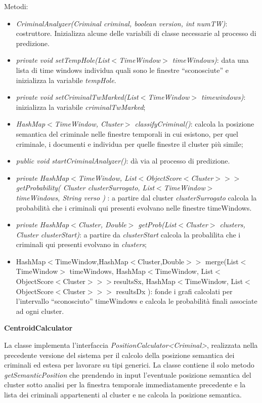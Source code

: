 Metodi:
\begin{itemize}
	\item \textit{CriminalAnalyzer(Criminal criminal, boolean version, int numTW)}: costruttore. Inizializza alcune delle variabili di classe necessarie al processo di predizione.
	\item \textit{private void setTempHole(List$<$TimeWindow$>$ timeWindows)}: data una lista di time windows individua quali sono le finestre ``sconosciute'' e inizializza la variabile \textit{tempHole}.
	\item \textit{private void setCriminalTwMarked(List$<$TimeWindow$>$ timewindows)}: inizializza la variabile \textit{criminalTwMarked};
	\item \textit{HashMap$<$TimeWindow, Cluster$>$ classifyCriminal()}: calcola la posizione semantica del criminale nelle finestre temporali in cui esistono, per quel criminale, i documenti e individua per quelle finestre il cluster più simile;
	\item \textit{public void startCriminalAnalyzer()}: dà via al processo di predizione.
	\item \textit{private  HashMap$<$TimeWindow, List$<$ObjectScore$<$Cluster$>>>$ getProbability( Cluster clusterSurrogato, List$<$TimeWindow$>$ timeWindows, String verso ) }: a partire dal cluster \textit{clusterSurrogato} calcola la probabilità che i criminali qui presenti evolvano nelle finestre timeWindows. 
	\item \textit{private HashMap$<$Cluster, Double$>$ getProb(List$<$Cluster$>$ clusters, Cluster clusterStart)}: a partire da \textit{clusterStart} calcola la probalilita che i criminali qui presenti evolvano in \textit{clusters};
	\item HashMap$<$TimeWindow,HashMap$<$Cluster,Double$>>$ merge(List$<$TimeWindow$>$ timeWindows, HashMap$<$TimeWindow, List$<$ObjectScore$<$Cluster$>>>$resultsSx, HashMap$<$TimeWindow, List$<$ObjectScore$<$Cluster$>>>$ resultsDx ): fonde i grafi calcolati per l'intervallo ``sconosciuto'' timeWindows e calcola le probabilità finali associate ad ogni cluster. 
\end{itemize}

\textbf{CentroidCalculator}

La classe implementa l'interfaccia \textit{PositionCalculator<Criminal>}, realizzata nella precedente versione del sistema per il calcolo della posizione semantica dei criminali ed estesa per lavorare su tipi generici. La classe contiene il solo metodo \textit{getSemanticPosition} che prendendo in input l'eventuale posizione semantica del cluster sotto analisi per la finestra temporale immediatamente precedente e la lista dei criminali appartenenti al cluster e ne calcola la posizione semantica. 

